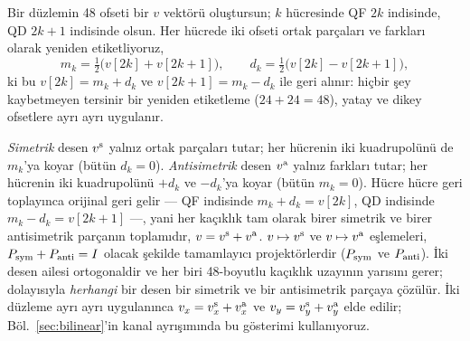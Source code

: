 \documentclass[aps,prab,reprint,superscriptaddress,nofootinbib]{revtex4-2}
\begin{document}
Bir düzlemin 48 ofseti bir $v$ vektörü oluştursun; $k$ hücresinde QF $2k$
indisinde, QD $2k{+}1$ indisinde olsun. Her hücrede iki ofseti ortak parçaları ve
farkları olarak yeniden etiketliyoruz,
\begin{equation}
  m_k = \tfrac12\big(v[2k]+v[2k{+}1]\big), \qquad
  d_k = \tfrac12\big(v[2k]-v[2k{+}1]\big),
  \label{eq:projectors}
\end{equation}
ki bu $v[2k] = m_k + d_k$ ve $v[2k{+}1] = m_k - d_k$ ile geri alınır: hiçbir şey
kaybetmeyen tersinir bir yeniden etiketleme ($24 + 24 = 48$), yatay ve dikey
ofsetlere ayrı ayrı uygulanır.

\emph{Simetrik} desen $v^{\rm s}$ yalnız ortak parçaları tutar; her hücrenin iki
kuadrupolünü de $m_k$'ya koyar (bütün $d_k = 0$). \emph{Antisimetrik} desen
$v^{\rm a}$ yalnız farkları tutar; her hücrenin iki kuadrupolünü $+d_k$ ve
$-d_k$'ya koyar (bütün $m_k = 0$). Hücre hücre geri toplayınca orijinal geri
gelir --- QF indisinde $m_k + d_k = v[2k]$, QD indisinde $m_k - d_k = v[2k{+}1]$
---, yani her kaçıklık tam olarak birer simetrik ve birer antisimetrik parçanın
toplamıdır, $v = v^{\rm s} + v^{\rm a}$. $v \mapsto v^{\rm s}$ ve
$v \mapsto v^{\rm a}$ eşlemeleri, $P_{\rm sym}+P_{\rm anti}=I$ olacak şekilde
tamamlayıcı projektörlerdir ($P_{\rm sym}$ ve $P_{\rm anti}$). İki desen ailesi
ortogonaldir ve her biri 48-boyutlu kaçıklık uzayının yarısını gerer; dolayısıyla
\emph{herhangi} bir desen bir simetrik ve bir antisimetrik parçaya çözülür. İki
düzleme ayrı ayrı uygulanınca $v_x = v_x^{\rm s} + v_x^{\rm a}$ ve
$v_y = v_y^{\rm s} + v_y^{\rm a}$ elde edilir; Böl.~\ref{sec:bilinear}'in kanal
ayrışımında bu gösterimi kullanıyoruz.
\end{document}
